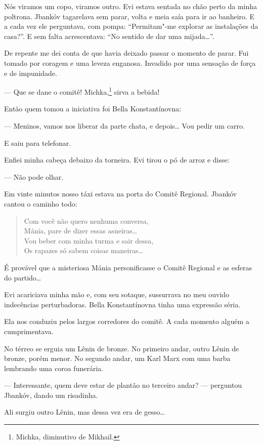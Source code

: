 Nós viramos um copo, viramos outro. Evi estava sentada no chão perto da
minha poltrona. Jbankóv tagarelava sem parar, volta e meia saía para ir
ao banheiro. E a cada vez ele perguntava, com pompa: ``Permitam"-me
explorar as instalações da casa?''. E sem falta acrescentava: ``No
sentido de dar uma mijada\ldots{}''.

De repente me dei conta de que havia deixado passar o momento de parar.
Fui tomado por coragem e uma leveza enganosa. Invadido por uma sensação
de força e de impunidade.

--- Que se dane o comitê! Michka,\footnote{Michka, diminutivo de Mikhail.} sirva a bebida!

Então quem tomou a iniciativa foi Bella Konstantínovna:

--- Meninos, vamos nos liberar da parte chata, e depois\ldots{} Vou pedir um carro.

E saiu para telefonar.

Enfiei minha cabeça debaixo da torneira. Evi tirou o pó de arroz e
disse:

--- Não pode olhar.

Em vinte minutos nosso táxi estava na porta do Comitê Regional. Jbankóv
cantou o caminho todo:

\begin{verse}
Com você não quero nenhuma conversa,\\
Mánia, pare de dizer essas asneiras\ldots{}\\
Vou beber com minha turma e sair dessa,\\
Os rapazes só sabem coisas maneiras\ldots{}
\end{verse}

É provável que a misteriosa Mánia personificasse o Comitê Regional e as
esferas do partido\ldots{}

Evi acariciava minha mão e, com seu sotaque, sussurrava no meu ouvido
indecências perturbadoras. Bella Konstantínovna tinha uma expressão
séria.

Ela nos conduziu pelos largos corredores do comitê. A cada momento
alguém a cumprimentava.

No térreo se erguia um Lênin de bronze. No primeiro andar, outro Lênin
de bronze, porém menor. No segundo andar, um Karl Marx com uma barba
lembrando uma coroa funerária.

--- Interessante, quem deve estar de plantão no terceiro andar?
--- perguntou Jbankóv, dando um risadinha.

Ali surgiu outro Lênin, mas dessa vez era de gesso\ldots{}

